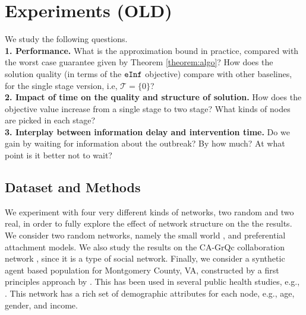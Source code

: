 \section{Experiments (OLD)}
\label{sec:experiments2}

We study the following questions. \\
\noindent
\textbf{1. Performance.} What is the approximation bound in practice, compared with the worst case guarantee given by Theorem \ref{theorem:algo}? How does the solution quality (in terms of the $\texttt{eInf}{}$ objective) compare with other baselines, for the single stage version, i.e, $\mathcal{T}=\{0\}$?\\
\noindent
\textbf{2. Impact of time on the quality and structure of solution.} How does the objective value increase from a single stage to two stage? What kinds of nodes are picked in each stage?\\
\textbf{3. Interplay between information delay and intervention time.} Do we gain by waiting for information about the outbreak? By how much? At what point is it better not to wait?





\subsection{Dataset and Methods}
We experiment with four very different kinds of networks, two random and two real, in order to fully explore the effect of network structure on the the results. We consider two random networks, namely the small world 
\cite{Kleinberg00thesmall-world}, and preferential attachment \cite{Barabasi509} models. We also study the results on the CA-GrQc collaboration network \cite{Leskovec:2007:GED:1217299.1217301}, since it is a type of social network. Finally, we consider a synthetic agent based population for Montgomery County, VA, constructed by a first principles approach by \cite{barrett:wsc09,eubank:nature04}. This has been used in several public health studies, e.g., \cite{singh:bmc19}. This network has a rich set of demographic attributes for each node, e.g., age, gender, and income.

